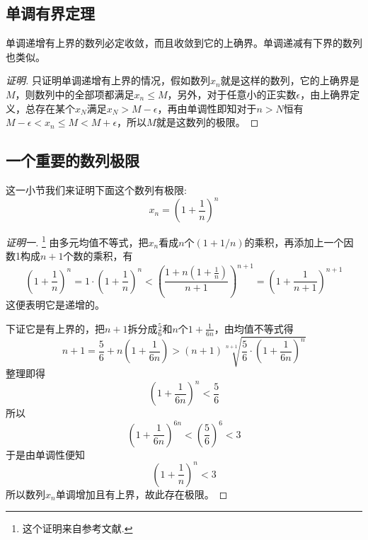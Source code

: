 \subsection{单调有界定理}
\label{sec:monotone-bound-theorem}

\begin{theorem}
  单调递增有上界的数列必定收敛，而且收敛到它的上确界。单调递减有下界的数列也类似。
\end{theorem}

\begin{proof}[证明]
  只证明单调递增有上界的情况，假如数列$x_n$就是这样的数列，它的上确界是$M$，则数列中的全部项都满足$x_n \leqslant M$，另外，对于任意小的正实数$\epsilon$，由上确界定义，总存在某个$x_N$满足$x_N>M-\epsilon$，再由单调性即知对于$n>N$恒有$M-\epsilon < x_n \leqslant M < M+\epsilon$，所以$M$就是这数列的极限。
\end{proof}

\subsection{一个重要的数列极限}
\label{sec:a-import-sequence-limit}

这一小节我们来证明下面这个数列有极限:
\[ x_n=\left( 1+\frac{1}{n} \right)^n \]

\begin{proof}[证明一]\footnote{这个证明来自参考文献\cite{olympic-math}.}
  由多元均值不等式，把$x_n$看成$n$个$(1+1/n)$的乘积，再添加上一个因数1构成$n+1$个数的乘积，有
  \[ \left( 1+\frac{1}{n} \right)^n = 1 \cdot \left( 1+\frac{1}{n} \right)^n < \left( \frac{1+n\left( 1+\frac{1}{n} \right)}{n+1} \right)^{n+1} = \left( 1+\frac{1}{n+1} \right)^{n+1} \]
  这便表明它是递增的。

  下证它是有上界的，把$n+1$拆分成$\frac{5}{6}$和$n$个$1+\frac{1}{6n}$，由均值不等式得
  \[ n+1 = \frac{5}{6} + n \left( 1+\frac{1}{6n} \right) > (n+1)\sqrt[n+1]{\frac{5}{6} \cdot \left( 1+\frac{1}{6n} \right)^n} \]
  整理即得
  \[ \left( 1+\frac{1}{6n} \right)^n < \frac{5}{6} \]
  所以
  \[ \left( 1+\frac{1}{6n} \right)^{6n} < \left( \frac{5}{6} \right)^6 < 3 \]
  于是由单调性便知
  \[ \left( 1+\frac{1}{n} \right)^n < 3 \]
  所以数列$x_n$单调增加且有上界，故此存在极限。
\end{proof}

